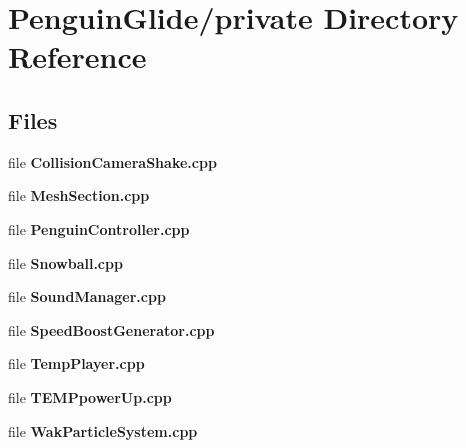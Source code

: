 \section{Penguin\+Glide/private Directory Reference}
\label{dir_86832a87c402c68e86a48304ec825d45}
\subsection*{Files}
\begin{DoxyCompactItemize}
\item 
file \textbf{ Collision\+Camera\+Shake.\+cpp}
\item 
file \textbf{ Mesh\+Section.\+cpp}
\item 
file \textbf{ Penguin\+Controller.\+cpp}
\item 
file \textbf{ Snowball.\+cpp}
\item 
file \textbf{ Sound\+Manager.\+cpp}
\item 
file \textbf{ Speed\+Boost\+Generator.\+cpp}
\item 
file \textbf{ Temp\+Player.\+cpp}
\item 
file \textbf{ T\+E\+M\+Ppower\+Up.\+cpp}
\item 
file \textbf{ Wak\+Particle\+System.\+cpp}
\end{DoxyCompactItemize}
